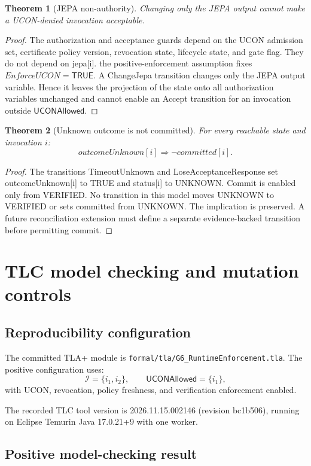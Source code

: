 \documentclass[11pt,a4paper]{article}
\newtheorem{theorem}{Theorem}[section]
\theoremstyle{remark}
\newcommand{\UCONInv}{\mathcal I}
\newcommand{\UCONAllowed}{\mathsf{UCONAllowed}}
\begin{document}
\begin{theorem}[JEPA non-authority]
Changing only the JEPA output cannot make a UCON-denied invocation acceptable.
\end{theorem}
\begin{proof}
The authorization and acceptance guards depend on the UCON admission set, certificate policy version, revocation state, lifecycle state, and gate flag. They do not depend on jepa[i]. the positive-enforcement assumption fixes $EnforceUCON=\mathsf{TRUE}$. A ChangeJepa transition changes only the JEPA output variable. Hence it leaves the projection of the state onto all authorization variables unchanged and cannot enable an Accept transition for an invocation outside $\UCONAllowed$.
\end{proof}

\begin{theorem}[Unknown outcome is not committed]
For every reachable state and invocation $i$:
\[
outcomeUnknown[i]\Rightarrow\neg committed[i].
\]
\end{theorem}
\begin{proof}
The transitions TimeoutUnknown and LoseAcceptanceResponse set outcomeUnknown[i] to TRUE and status[i] to UNKNOWN. Commit is enabled only from VERIFIED. No transition in this model moves UNKNOWN to VERIFIED or sets committed from UNKNOWN. The implication is preserved. A future reconciliation extension must define a separate evidence-backed transition before permitting commit.
\end{proof}

\section{TLC model checking and mutation controls}

\subsection{Reproducibility configuration}

The committed TLA+ module is \texttt{formal/tla/G6\_RuntimeEnforcement.tla}. The positive configuration uses:
\[
\UCONInv=\{i_1,i_2\},\qquad \UCONAllowed=\{i_1\},
\]
with UCON, revocation, policy freshness, and verification enforcement enabled.

The recorded TLC tool version is 2026.11.15.002146 (revision bc1b506), running on Eclipse Temurin Java 17.0.21+9 with one worker.

\subsection{Positive model-checking result}
\end{document}
